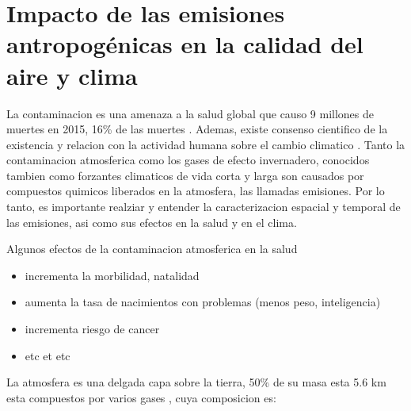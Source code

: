 \documentclass[]{book}
\providecommand{\tightlist}{%
  \setlength{\itemsep}{0pt}\setlength{\parskip}{0pt}}
\begin{document}
\hypertarget{impacto-de-las-emisiones-antropogenicas-en-la-calidad-del-aire-y-clima}{%
\chapter{Impacto de las emisiones antropogénicas en la calidad del aire y clima}\label{impacto-de-las-emisiones-antropogenicas-en-la-calidad-del-aire-y-clima}}

La contaminacion es una amenaza a la salud global que causo 9 millones de muertes en 2015, 16\% de las muertes \citep{landrigan2018lancet}. Ademas, existe consenso cientifico de la existencia y relacion con la actividad humana sobre el cambio climatico \citep{cook2016consensus}. Tanto la contaminacion atmosferica como los gases de efecto invernadero, conocidos tambien como forzantes climaticos de vida corta y larga son causados por compuestos quimicos liberados en la atmosfera, las llamadas emisiones. Por lo tanto, es importante realziar y entender la caracterizacion espacial y temporal de las emisiones, asi como sus efectos en la salud y en el clima.

Algunos efectos de la contaminacion atmosferica en la salud

\begin{itemize}
\tightlist
\item
  incrementa la morbilidad, natalidad
\item
  aumenta la tasa de nacimientos con problemas (menos peso, inteligencia)
\item
  incrementa riesgo de cancer
\item
  etc et etc
\end{itemize}

La atmosfera es una delgada capa sobre la tierra, 50\% de su masa esta 5.6 km esta compuestos por varios gases \citep{brasseur2017modeling}, cuya composicion es:
\end{document}
